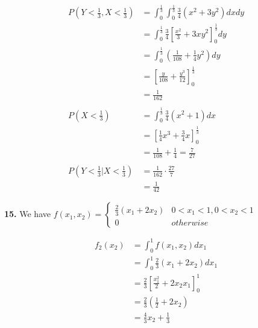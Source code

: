 \documentclass[12pt]{report}
\newcommand{\twopartdef}[4]
{
	\left\{
	\begin{array}{ll}
		#1 & \mbox{} #2 \\
		#3 & \mbox{} #4
	\end{array}
	\right.
}
\begin{document}
\begin{align*}
P\left(Y < \frac{1}{3}, X < \frac{1}{3}\right) &= \int_{0}^{\frac{1}{3}}\int_0^{\frac{1}{3}}\frac{3}{4}(x^2+3y^2)dxdy\\
&= \int_0^{\frac{1}{3}}\frac{3}{4}\left[\frac{x^2}{3} + 3xy^2\right]_0^{\frac{1}{3}}dy\\
&= \int_{0}^{\frac{1}{3}}\left(\frac{1}{108} + \frac{1}{4}y^2\right)dy\\
&= \left[\frac{y}{108} + \frac{y^3}{12}\right]_0^{\frac{1}{3}}\\
&= \boxed{\frac{1}{162}}\\\\
P\left(X < \frac{1}{3}\right) &= \int_0^\frac{1}{3}\frac{3}{4}(x^2+1)dx\\
&= \left[\frac{1}{4}x^3 + \frac{3}{4}x\right]_0^\frac{1}{3}\\
&= \frac{1}{108} + \frac{1}{4} = \boxed{\frac{7}{27}}\\\\
P\left(Y < \frac{1}{3} | X < \frac{1}{3}\right) &= \frac{1}{162} \cdot \frac{27}{7}\\
&= \boxed{\frac{1}{42}}
\end{align*}

\pagebreak
\noindent \textbf{15.} We have $ f(x_1, x_2)  = \twopartdef{\frac{2}{3}(x_1+2x_2)}{0 < x_1 < 1, 0 < x_2 < 1}{0}{otherwise}$ 

\begin{align*}
f_2(x_2) &= \int_0^1 f(x_1, x_2)dx_1\\
&= \int_0^1\frac{2}{3}(x_1+2x_2)dx_1\\
&= \frac{2}{3}\left[\frac{x_1^2}{2} + 2x_2x_1\right]_0^1\\
&= \frac{2}{3}\left(\frac{1}{2} + 2x_2\right)\\
&= \boxed{\frac{4}{3}x_2 + \frac{1}{3}}
\end{align*}
\end{document}

